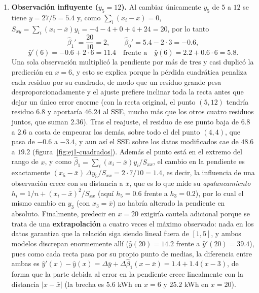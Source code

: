 \begin{enumerate}
\item \textbf{Observación influyente ($y_5 = 12$).}
Al cambiar únicamente $y_5$ de $5$ a $12$ se tiene $\bar y=27/5=5.4$ y,
como $\sum_i(x_i-\bar x)=0$,
$S_{xy}=\sum_i(x_i-\bar x)y_i=-4-4+0+4+24=20$, por lo tanto
\[
    \hat\beta_1' = \frac{20}{10} = 2, \qquad
    \hat\beta_0' = 5.4 - 2\cdot 3 = -0.6,
\]
\[
    \hat y'(6) = -0.6 + 2\cdot 6 = 11.4
    \quad\text{frente a}\quad
    \hat y(6) = 2.2 + 0.6\cdot 6 = 5.8 .
\]
Una sola observación multiplicó la pendiente por más de tres y casi
duplicó la predicción en $x=6$, y esto se explica porque la pérdida
cuadrática penaliza cada residuo por su cuadrado, de modo que un residuo
grande pesa desproporcionadamente y el ajuste prefiere inclinar toda la
recta antes que dejar un único error enorme (con la recta original, el
punto $(5,12)$ tendría residuo $6.8$ y aportaría $46.24$ al SSE, mucho
más que los otros cuatro residuos juntos, que suman $2.36$). Tras el
reajuste, el residuo de ese punto baja de $6.8$ a $2.6$ a costa de
empeorar los demás, sobre todo el del punto $(4,4)$, que pasa de $-0.6$ a
$-3.4$, y aun así el SSE sobre los datos modificados cae de $48.6$ a
$19.2$ (figura~\ref{fig:ej1-cuadrados}). Además el punto está en el
extremo del rango de $x$, y como $\hat\beta_1=\sum_i(x_i-\bar x)y_i/S_{xx}$,
el cambio en la pendiente es exactamente
$(x_5-\bar x)\,\Delta y_5/S_{xx}=2\cdot7/10=1.4$, es decir, la influencia
de una observación crece con su distancia a $\bar x$, que es lo que
mide su \emph{apalancamiento} $h_i=1/n+(x_i-\bar x)^2/S_{xx}$ (aquí
$h_5=0.6$ frente a $h_3=0.2$), por lo cual el mismo cambio en $y_3$ (con
$x_3=\bar x$) no habría alterado la pendiente en absoluto.
Finalmente, predecir en $x=20$ exigiría cautela adicional porque se
trata de una \textbf{extrapolación} a cuatro veces el máximo observado:
nada en los datos garantiza que la relación siga siendo lineal fuera de
$[1,5]$, y ambos modelos discrepan enormemente allí
($\hat y(20)=14.2$ frente a $\hat y'(20)=39.4$), pues como cada recta
pasa por su propio punto de medias, la diferencia entre ambas es
$\hat y'(x)-\hat y(x)=\Delta\bar y+\Delta\hat\beta_1(x-\bar x)=1.4+1.4(x-3)$,
de forma que la parte debida al error en la pendiente crece linealmente
con la distancia $|x-\bar x|$ (la brecha es $5.6$ kWh en $x=6$ y
$25.2$ kWh en $x=20$).

\end{enumerate}

